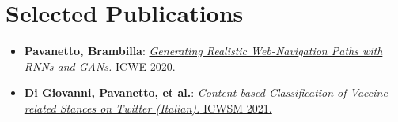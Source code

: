 \documentclass[hidelinks,letterpaper,11pt]{article}
\newcommand{\resumeItem}[2]{
  \item\small{
    \textbf{#1}{: #2 \vspace{-2pt}}
  }
}
\newcommand{\resumeSubItem}[2]{\resumeItem{#1}{#2}\vspace{-4pt}}
\newcommand{\resumeSubHeadingListStart}{\begin{itemize}[leftmargin=*]}
\newcommand{\resumeSubHeadingListEnd}{\end{itemize}}
\begin{document}
\section{Selected Publications}
  \resumeSubHeadingListStart
    \resumeSubItem
    {Pavanetto, Brambilla}{\href{https://doi.org/10.1007/978-3-030-50578-3_17}{\textit{Generating Realistic Web-Navigation Paths with RNNs and GANs.} ICWE 2020.}}
    \resumeSubItem
    {Di Giovanni, Pavanetto, et al.}{\href{https://re.public.polimi.it/retrieve/handle/11311/1198722/694532/2021_52.pdf}{\textit{Content-based Classification of Vaccine-related Stances on Twitter (Italian).} ICWSM 2021.}}
  \resumeSubHeadingListEnd
\end{document}
